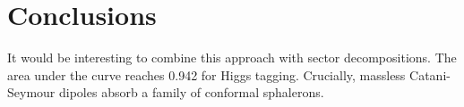 \section{Conclusions}\label{sec:conclusions}

It would be interesting to combine this approach with sector
decompositions. The area under the curve reaches 0.942 for Higgs
tagging. Crucially, massless Catani-Seymour dipoles absorb a family of
conformal sphalerons.

